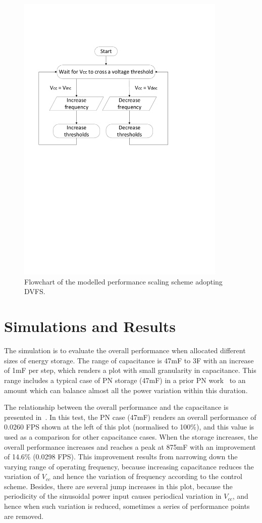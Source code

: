 \begin{figure} [!tb]
    \centering
    \includegraphics[width=10cm]{figure/work2/pncontrol}
    \caption{Flowchart of the modelled performance scaling scheme adopting DVFS.}
    \label{Figure:pncontrol}
\end{figure} 

\section{Simulations and Results}

The simulation is to evaluate the overall performance when allocated different sizes of energy storage. The range of capacitance is 47mF to 3F with an increase of 1mF per step, which renders a plot with small granularity in capacitance. This range includes a typical case of PN storage (47mF) in a prior PN work~\cite{fletcher2017power} to an amount which can balance almost all the power variation within this duration.

The relationship between the overall performance and the capacitance is presented in~. In this test, the PN case (47mF) renders an overall performance of 0.0260 FPS shown at the left of this plot (normalised to 100\%), and this value is used as a comparison for other capacitance cases. When the storage increases, the overall performance increases and reaches a peak at 875mF with an improvement of 14.6\% (0.0298 FPS). This improvement results from narrowing down the varying range of operating frequency, because increasing capacitance reduces the variation of $V_{cc}$ and hence the variation of frequency according to the control scheme. Besides, there are several jump increases in this plot, because the periodicity of the sinusoidal power input causes periodical variation in $V_{cc}$, and hence when such variation is reduced, sometimes a series of performance points are removed.

